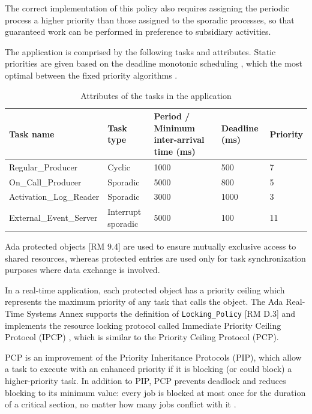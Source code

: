 \documentclass{article}
\begin{document}
The correct implementation of this policy also requires assigning the periodic process a higher priority than those assigned to the sporadic processes, so that guaranteed work can be performed in preference to subsidiary activities.

The application is comprised by the following tasks and attributes. Static priorities are given based on the deadline monotonic scheduling \cite{rm-dm}, which the most optimal between the fixed priority algorithms \cite{optimality-rm-dm}.

\begin{table}[!htbp]
   \centering
   \begin{tabular}{lllll}
     \toprule
     Task name & Task type & Period / Minimum inter-arrival time (ms) & Deadline (ms) & Priority  \\
     \midrule
     Regular\_Producer & Cyclic & 1000 & 500 & 7 \\
     On\_Call\_Producer & Sporadic & 5000 & 800 & 5 \\
     Activation\_Log\_Reader & Sporadic & 3000 & 1000 & 3 \\
     External\_Event\_Server & Interrupt sporadic & 5000 & 100 & 11 \\
     \bottomrule
   \end{tabular}
   \caption{Attributes of the tasks in the application \cite{ycs}}
   \label{tab:tasks-attributes}
\end{table}

Ada protected objects [RM 9.4] are used to ensure mutually exclusive access to shared resources, whereas protected entries are used only for task synchronization purposes where data exchange is involved.

In a real-time application, each protected object has a priority ceiling which represents the maximum priority of any task that calls the object. The Ada Real-Time Systems Annex supports the definition of  \texttt{Locking\_Policy} [RM D.3] and implements the resource locking protocol called Immediate Priority Ceiling Protocol (IPCP) \cite{ada-pcp}, which is similar to the Priority Ceiling Protocol (PCP).

PCP is an improvement of the Priority Inheritance Protocols (PIP), which allow a task to execute with an enhanced priority if it is blocking (or could block) a higher-priority task. In addition to PIP, PCP prevents deadlock and reduces blocking to its minimum value: every job is blocked at most once for the duration of a critical section, no matter how many jobs conflict with it \cite{pcp-blocking}.
\end{document}
